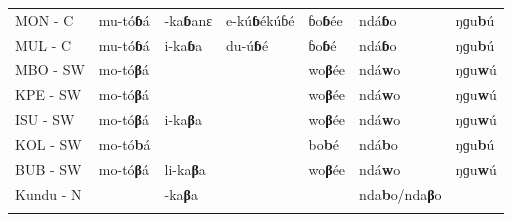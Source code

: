 \documentclass[output=paper,colorlinks,citecolor=brown
]{langscibook}
\begin{document}
\begin{table}
{\begin{tabular}{lllllll}
MON - C                   & mu-tó\textbf{ɓ}á             & -ka\textbf{ɓ}anɛ                  & e-kú\textbf{ɓ}ékúɓé           & ɓo\textbf{ɓ}ée                       & ndá\textbf{ɓ}o                   & ŋɡu\textbf{b}ú                   \\
MUL - C                   & mu-tó\textbf{ɓ}á             & i-ka\textbf{ɓ}a                   & du-ú\textbf{ɓ}é                 & ɓo\textbf{ɓ}é                        & ndá\textbf{ɓ}o                   & ŋɡu\textbf{b}ú                   \\
MBO - SW                  & mo-tó\textbf{β}á             &                          &                          & wo\textbf{β}ée                       & ndá\textbf{w}o                   & ŋɡu\textbf{w}ú                  \\
KPE - SW                  & mo-tó\textbf{β}á             &                          &                          & wo\textbf{β}ée                       & ndá\textbf{w}o                   & ŋɡu\textbf{w}ú                  \\
ISU - SW                  & mo-tó\textbf{β}á             & i-ka\textbf{β}a                   &                          & wo\textbf{β}ée                       & ndá\textbf{w}o                   & ŋɡu\textbf{w}ú                  \\
KOL - SW                  & mo-tó\textbf{b}á             &                          &                          & bo\textbf{b}é                        & ndá\textbf{b}o                   & ŋɡu\textbf{b}ú                   \\
BUB - SW                  & mo-tó\textbf{β}á             & li-ka\textbf{β}a                  &                          & wo\textbf{β}ée                       & ndá\textbf{w}o                   & ŋɡu\textbf{w}ú                  \\
Kundu - N                 &                       & -ka\textbf{β}a                    &                          &                              & nda\textbf{b}o/nda\textbf{β}o             &                     \\ 
   \lspbottomrule
 \end{tabular}
 }
\end{table}
\end{document}
